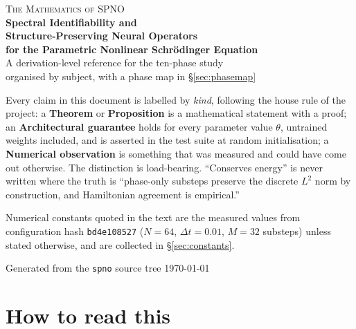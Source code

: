 \documentclass[11pt,a4paper]{article}
\theoremstyle{plain}
\theoremstyle{definition}
\theoremstyle{remark}
\newcommand{\dt}{\Delta t}
\newcommand{\code}[1]{\texttt{\small #1}}
\begin{document}
\begin{titlepage}
\centering
\vspace*{2.2cm}

{\Large\scshape The Mathematics of SPNO}\\[0.9em]

{\LARGE\bfseries Spectral Identifiability and\\[0.25em]
Structure-Preserving Neural Operators\\[0.35em]
for the Parametric Nonlinear Schr\"odinger Equation}\\[2.2em]

{\large A derivation-level reference for the ten-phase study}\\[0.6em]
{\normalsize organised by subject, with a phase map in \S\ref{sec:phasemap}}\\[3.2em]

\begin{minipage}{0.82\textwidth}\small
Every claim in this document is labelled by \emph{kind}, following the house rule of the
project: a \textbf{Theorem} or \textbf{Proposition} is a mathematical statement with a
proof; an \textbf{Architectural guarantee} holds for every parameter value $\theta$,
untrained weights included, and is asserted in the test suite at random initialisation;
a \textbf{Numerical observation} is something that was measured and could have come out
otherwise. The distinction is load-bearing. ``Conserves energy'' is never written where
the truth is ``phase-only substeps preserve the discrete $L^2$ norm by construction, and
Hamiltonian agreement is empirical.''

\vspace{0.9em}
Numerical constants quoted in the text are the measured values from configuration hash
\code{bd4e108527} ($N=64$, $\dt=0.01$, $M=32$ substeps) unless stated otherwise, and are
collected in \S\ref{sec:constants}.
\end{minipage}

\vfill
{\small Generated from the \code{spno} source tree \textemdash{} \today}
\end{titlepage}

\tableofcontents
\newpage
{}

\section*{How to read this}
\end{document}
